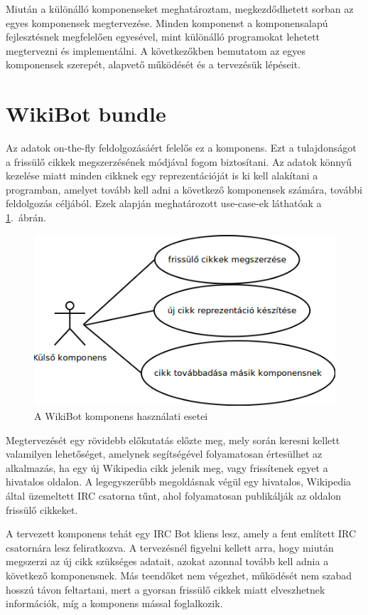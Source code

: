 Miután a különálló komponenseket meghatároztam, megkezdődhetett sorban az egyes komponensek megtervezése. Minden komponenst a komponensalapú fejlesztésnek megfelelően egyesével, mint különálló programokat lehetett megtervezni és implementálni. A következőkben bemutatom az egyes komponensek szerepét, alapvető működését és a tervezésük lépéseit.

\section{WikiBot bundle}
\label{sec:wikibotbundle}

Az adatok on-the-fly feldolgozásáért felelős ez a komponens. Ezt a tulajdonságot a frissülő cikkek megszerzésének módjával fogom biztosítani. Az adatok könnyű kezelése miatt minden cikknek egy reprezentációját is ki kell alakítani a programban, amelyet tovább kell adni a következő komponensek számára, további feldolgozás céljából. Ezek alapján meghatározott use-case-ek láthatóak a \ref{fig:usecase_wikiBot}.~ábrán.

\begin{figure}[htp]
\centering
\includegraphics[scale=0.5]{img/usecase_wikiBot}
\caption{A WikiBot komponens használati esetei}
\label{fig:usecase_wikiBot}
\end{figure}

Megtervezését egy rövidebb előkutatás előzte meg, mely során keresni kellett valamilyen lehetőséget, amelynek segítségével folyamatosan értesülhet az alkalmazás, ha egy új Wikipedia cikk jelenik meg, vagy frissítenek egyet a hivatalos oldalon. A legegyszerűbb megoldásnak végül egy hivatalos, Wikipedia által üzemeltett IRC csatorna tűnt, ahol folyamatosan publikálják az oldalon frissülő cikkeket.

A tervezett komponens tehát egy IRC Bot kliens lesz, amely a fent említett IRC csatornára lesz feliratkozva. A tervezésnél figyelni kellett arra, hogy miután megszerzi az új cikk szükséges adatait, azokat azonnal tovább kell adnia a következő komponensnek. Más teendőket nem végezhet, működését nem szabad hosszú távon feltartani, mert a gyorsan frissülő cikkek miatt elveszhetnek információk, míg a komponens mással foglalkozik.

